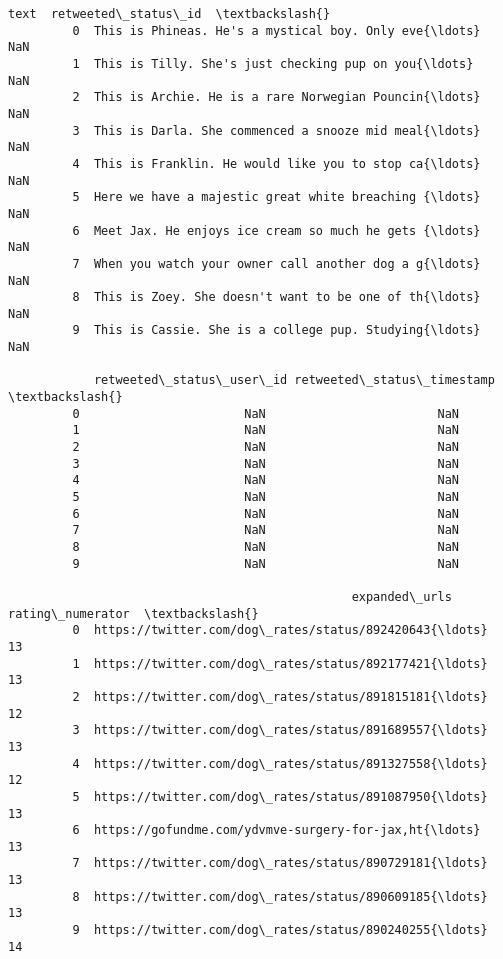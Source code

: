 \documentclass[11pt]{article}
\begin{document}
\begin{Verbatim}[commandchars=\\\{\}]
                                                         text  retweeted\_status\_id  \textbackslash{}
         0  This is Phineas. He's a mystical boy. Only eve{\ldots}                  NaN   
         1  This is Tilly. She's just checking pup on you{\ldots}                  NaN   
         2  This is Archie. He is a rare Norwegian Pouncin{\ldots}                  NaN   
         3  This is Darla. She commenced a snooze mid meal{\ldots}                  NaN   
         4  This is Franklin. He would like you to stop ca{\ldots}                  NaN   
         5  Here we have a majestic great white breaching {\ldots}                  NaN   
         6  Meet Jax. He enjoys ice cream so much he gets {\ldots}                  NaN   
         7  When you watch your owner call another dog a g{\ldots}                  NaN   
         8  This is Zoey. She doesn't want to be one of th{\ldots}                  NaN   
         9  This is Cassie. She is a college pup. Studying{\ldots}                  NaN   
         
            retweeted\_status\_user\_id retweeted\_status\_timestamp  \textbackslash{}
         0                       NaN                        NaN   
         1                       NaN                        NaN   
         2                       NaN                        NaN   
         3                       NaN                        NaN   
         4                       NaN                        NaN   
         5                       NaN                        NaN   
         6                       NaN                        NaN   
         7                       NaN                        NaN   
         8                       NaN                        NaN   
         9                       NaN                        NaN   
         
                                                expanded\_urls  rating\_numerator  \textbackslash{}
         0  https://twitter.com/dog\_rates/status/892420643{\ldots}                13   
         1  https://twitter.com/dog\_rates/status/892177421{\ldots}                13   
         2  https://twitter.com/dog\_rates/status/891815181{\ldots}                12   
         3  https://twitter.com/dog\_rates/status/891689557{\ldots}                13   
         4  https://twitter.com/dog\_rates/status/891327558{\ldots}                12   
         5  https://twitter.com/dog\_rates/status/891087950{\ldots}                13   
         6  https://gofundme.com/ydvmve-surgery-for-jax,ht{\ldots}                13   
         7  https://twitter.com/dog\_rates/status/890729181{\ldots}                13   
         8  https://twitter.com/dog\_rates/status/890609185{\ldots}                13   
         9  https://twitter.com/dog\_rates/status/890240255{\ldots}                14   
         

\end{Verbatim}
\end{document}
